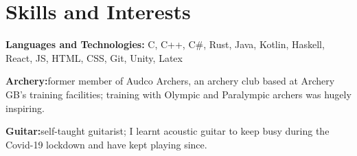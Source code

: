 \documentclass{article}
\newcommand{\tab}{\hspace{1em}}
\begin{document}
\section*{Skills and Interests}

\textbf{Languages and Technologies:}{\tab}
    C, C++, C\#, Rust, Java, Kotlin, Haskell, React, JS, HTML, CSS, %
    Git, Unity, Latex


\noindent\textbf{Archery:}{\tab}former member of Audco Archers, an archery club based at Archery GB's training facilities;
training with Olympic and Paralympic archers was hugely inspiring.

\noindent\textbf{Guitar:}{\tab}self-taught guitarist; I learnt acoustic guitar to keep busy during the Covid-19 lockdown
and have kept playing since.
\end{document}

